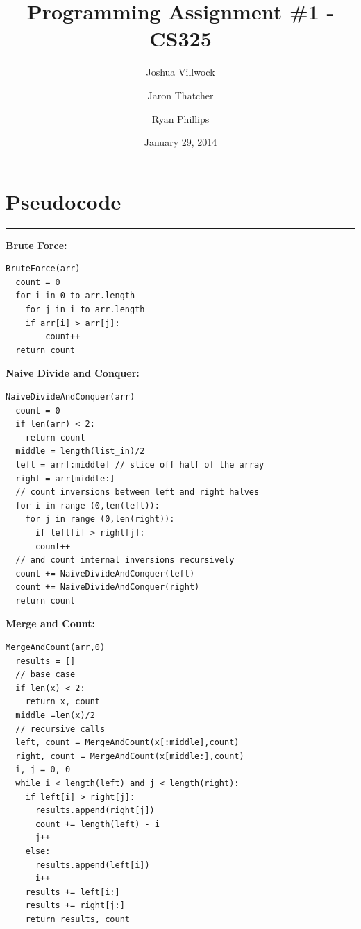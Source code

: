 \documentclass[letterpaper,10pt,titlepage,fleqn]{article}
\begin{document}
\lstset{language=Python} 

\title{Programming Assignment \#1 - CS325}

\author{
	Joshua Villwock \and
	Jaron Thatcher \and
	Ryan Phillips
}

\date{January 29, 2014}
\maketitle

\section*{Pseudocode}
\hrule
\begin{centering}

\textbf{Brute Force:}
\end{centering}
\begin{lstlisting}
BruteForce(arr)
  count = 0
  for i in 0 to arr.length
    for j in i to arr.length
	if arr[i] > arr[j]:
        count++ 
  return count
\end{lstlisting}

\begin{centering}
\textbf{Naive Divide and Conquer:}
\end{centering}
\begin{lstlisting}
NaiveDivideAndConquer(arr)
  count = 0
  if len(arr) < 2:
    return count
  middle = length(list_in)/2
  left = arr[:middle] // slice off half of the array
  right = arr[middle:]
  // count inversions between left and right halves
  for i in range (0,len(left)):
    for j in range (0,len(right)):
      if left[i] > right[j]:
	  count++
  // and count internal inversions recursively
  count += NaiveDivideAndConquer(left)
  count += NaiveDivideAndConquer(right)
  return count
\end{lstlisting}

\begin{centering}
\textbf{Merge and Count:}
\end{centering}

\begin{lstlisting}
MergeAndCount(arr,0)
  results = []
  // base case
  if len(x) < 2:
    return x, count
  middle =len(x)/2
  // recursive calls
  left, count = MergeAndCount(x[:middle],count)
  right, count = MergeAndCount(x[middle:],count)
  i, j = 0, 0
  while i < length(left) and j < length(right):
    if left[i] > right[j]:
      results.append(right[j])
      count += length(left) - i
      j++
    else:
      results.append(left[i])
      i++
    results += left[i:]
    results += right[j:]
    return results, count
\end{lstlisting}
\end{document}
